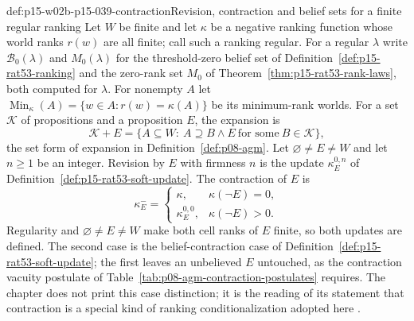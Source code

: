 \begin{hbdefinition}{def:p15-w02b-p15-039-contraction}{Revision, contraction and belief sets for a finite regular ranking}
Let \(W\) be finite and let \(\kappa\) be a negative ranking function whose
world ranks \(r(w)\) are all finite; call such a ranking regular.  For a
regular \(\lambda\) write \(\mathcal B_0(\lambda)\) and \(M_0(\lambda)\) for
the threshold-zero belief set of Definition~\ref{def:p15-rat53-ranking} and
the zero-rank set \(M_0\) of Theorem~\ref{thm:p15-rat53-rank-laws}, both
computed for \(\lambda\).  For nonempty \(A\) let
\(\operatorname{Min}_\kappa(A)=\{w\in A:r(w)=\kappa(A)\}\) be its
minimum-rank worlds.  For a set \(\mathcal K\) of propositions and a
proposition \(E\), the expansion is
\[
 \mathcal K+E=\{A\subseteq W:\ A\supseteq B\land E\ \text{for some}\ B\in\mathcal K\},
\]
the set form of expansion in Definition~\ref{def:p08-agm}.  Let
\(\varnothing\ne E\ne W\) and let \(n\geq1\) be an integer.  Revision by
\(E\) with firmness \(n\) is the update \(\kappa^{0,n}_E\) of
Definition~\ref{def:p15-rat53-soft-update}.  The contraction of \(E\) is
\[
 \kappa^{-}_E=
 \begin{cases}
 \kappa,&\kappa(\neg E)=0,\\
 \kappa^{0,0}_E,&\kappa(\neg E)>0.
 \end{cases}
\]
Regularity and \(\varnothing\ne E\ne W\) make both cell ranks of \(E\)
finite, so both updates are defined.  The second case is the belief-contraction
case of Definition~\ref{def:p15-rat53-soft-update}; the first leaves an
unbelieved \(E\) untouched, as the contraction vacuity postulate of
Table~\ref{tab:p08-agm-contraction-postulates} requires.  The chapter does
not print this case distinction; it is the reading of its statement that
contraction is a special kind of ranking conditionalization adopted here
\parencite[pp.~340, 342]{KernIsbernerSkovgaardOlsenSpohn2021Ranking}.
\end{hbdefinition}

